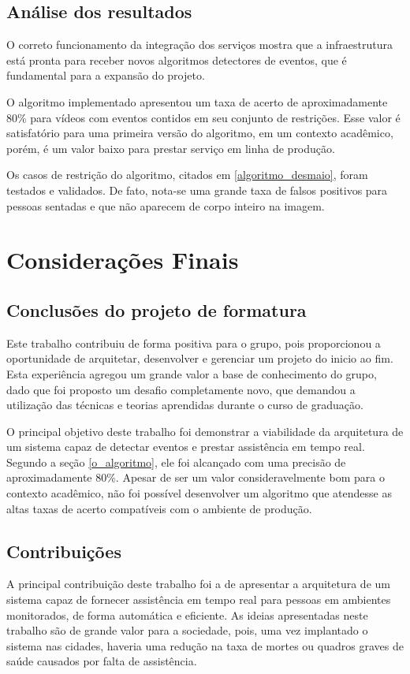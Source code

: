 \documentclass[]{politex}
\begin{document}
\section{Análise dos resultados}
O correto funcionamento da integração dos serviços mostra que a infraestrutura está pronta para receber novos algoritmos detectores de eventos, que é fundamental para a expansão do projeto.

O algoritmo implementado apresentou um taxa de acerto de aproximadamente 80\% para vídeos com eventos contidos em seu conjunto de restrições. Esse valor é satisfatório para uma primeira versão do algoritmo, em um contexto acadêmico, porém, é um valor baixo para prestar serviço em linha de produção.

Os casos de restrição do algoritmo, citados em \ref{algoritmo_desmaio}, foram testados e validados. De fato, nota-se uma grande taxa de falsos positivos para pessoas sentadas e que não aparecem de corpo inteiro na imagem.

\chapter{Considerações Finais}

\section{Conclusões do projeto de formatura}
Este trabalho contribuiu de forma positiva para o grupo, pois proporcionou a oportunidade de arquitetar, desenvolver e gerenciar um projeto do inicio ao fim. Esta experiência agregou um grande valor a base de conhecimento do grupo, dado que foi proposto um desafio completamente novo, que demandou a utilização das técnicas e teorias aprendidas durante o curso de graduação.

O principal objetivo deste trabalho foi demonstrar a viabilidade da arquitetura de um sistema capaz de detectar eventos e prestar assistência em tempo real. Segundo a seção \ref{o_algoritmo}, ele foi alcançado com uma precisão de aproximadamente 80\%. Apesar de ser um valor consideravelmente bom para o contexto acadêmico, não foi possível desenvolver um algoritmo que atendesse as altas taxas de acerto compatíveis com o ambiente de produção.

\section{Contribuições}
A principal contribuição deste trabalho foi a de apresentar a arquitetura de um sistema capaz de fornecer assistência em tempo real para pessoas em ambientes monitorados, de forma automática e eficiente. As ideias apresentadas neste trabalho são de grande valor para a sociedade, pois, uma vez implantado o sistema nas cidades, haveria uma redução na taxa de mortes ou quadros graves de saúde causados por falta de assistência.
\end{document}
